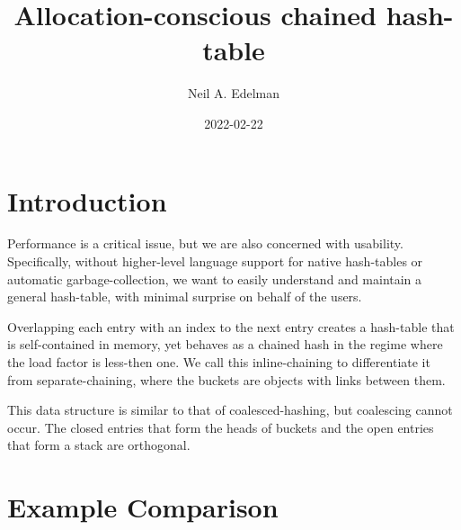 \documentclass[12pt]{article}
\author{Neil A. Edelman}
\title{Allocation-conscious chained hash-table}
\date{2022-02-22}
\begin{document}
\maketitle


\section{Introduction}

Performance is a critical issue, but we are also concerned with usability. Specifically, without higher-level language support for native hash-tables or automatic garbage-collection, we want to easily understand and maintain a general hash-table, with minimal surprise on behalf of the users.

Overlapping each entry with an index to the next entry creates a hash-table that is self-contained in memory, yet behaves as a chained hash in the regime where the load factor is less-then one.\cite{knuth1998sorting} We call this inline-chaining to differentiate it from separate-chaining, where the buckets are objects with links between them.

This data structure is similar to that of coalesced-hashing\cite{williams1959handling}, but coalescing cannot occur. The closed entries that form the heads of buckets and the open entries that form a stack are orthogonal.

\section{Example Comparison}
\end{document}
